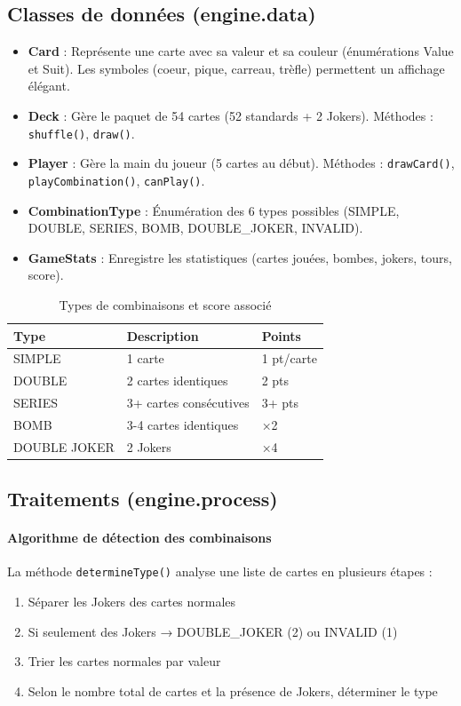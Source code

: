 \subsection{Classes de données (engine.data)}
\label{sec:data}
\begin{itemize}
\item \textbf{Card} : Représente une carte avec sa valeur et sa couleur (énumérations Value et Suit). Les symboles (coeur, pique, carreau, trèfle) permettent un affichage élégant.
\item \textbf{Deck} : Gère le paquet de 54 cartes (52 standards + 2 Jokers). Méthodes : \texttt{shuffle()}, \texttt{draw()}.
\item \textbf{Player} : Gère la main du joueur (5 cartes au début). Méthodes : \texttt{drawCard()}, \texttt{playCombination()}, \texttt{canPlay()}.
\item \textbf{CombinationType} : Énumération des 6 types possibles (SIMPLE, DOUBLE, SERIES, BOMB, DOUBLE\_JOKER, INVALID).
\item \textbf{GameStats} : Enregistre les statistiques (cartes jouées, bombes, jokers, tours, score).
\end{itemize}

\begin{table}[h!]
\centering
\begin{tabular}{|l|l|l|}
\hline
\textbf{Type} & \textbf{Description} & \textbf{Points} \\
\hline
SIMPLE & 1 carte & 1 pt/carte \\
DOUBLE & 2 cartes identiques & 2 pts \\
SERIES & 3+ cartes consécutives & 3+ pts \\
BOMB & 3-4 cartes identiques & ×2 \\
DOUBLE JOKER & 2 Jokers & ×4 \\
\hline
\end{tabular}
\caption{Types de combinaisons et score associé}
\label{tab:types}
\end{table}

\subsection{Traitements (engine.process)}
\label{sec:process}

\paragraph{Algorithme de détection des combinaisons}
La méthode \texttt{determineType()} analyse une liste de cartes en plusieurs étapes :
\begin{enumerate}
\item Séparer les Jokers des cartes normales
\item Si seulement des Jokers → DOUBLE\_JOKER (2) ou INVALID (1)
\item Trier les cartes normales par valeur
\item Selon le nombre total de cartes et la présence de Jokers, déterminer le type
\end{enumerate}

